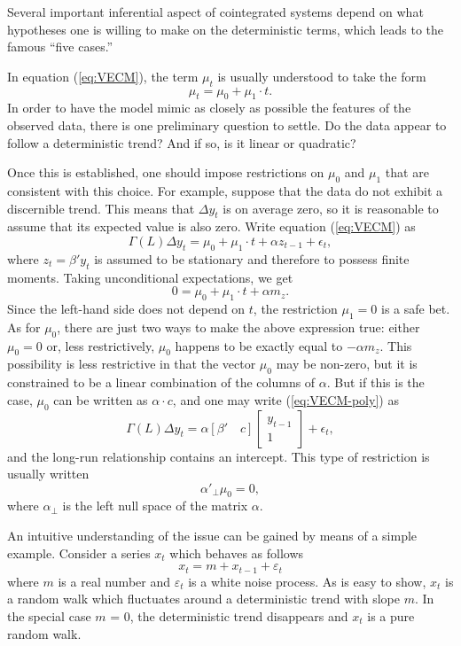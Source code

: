 Several important inferential aspect of cointegrated systems depend on
what hypotheses one is willing to make on the deterministic terms,
which leads to the famous ``five cases.''

In equation (\ref{eq:VECM}), the term $\mu_t$ is usually understood to
take the form
\[
  \mu_t = \mu_0 + \mu_1 \cdot t .
\]
In order to have the model mimic as closely as possible the features
of the observed data, there is one preliminary question to settle. Do
the data appear to follow a deterministic trend? And if so, is it
linear or quadratic?

Once this is established, one should impose restrictions on $\mu_0$
and $\mu_1$ that are consistent with this choice. For example, suppose
that the data do not exhibit a discernible trend. This means
that $\Delta y_t$ is on average zero, so it is reasonable to assume
that its expected value is also zero. Write equation (\ref{eq:VECM})
as
\begin{equation}
  \label{eq:VECM-poly}
  \Gamma(L) \Delta y_t = \mu_0 + \mu_1 \cdot t + \alpha z_{t-1} +
  \epsilon_t ,
\end{equation}
where $z_{t} = \beta' y_{t}$ is assumed to be stationary and therefore
to possess finite moments. Taking unconditional expectations, we get
\[ 
  0 = \mu_0 + \mu_1 \cdot t + \alpha m_z .
\]
Since the left-hand side does not depend on $t$, the restriction
$\mu_1 = 0$ is a safe bet. As for $\mu_0$, there are just two ways to
make the above expression true: either $\mu_0 = 0$ or, less
restrictively, $\mu_0$ happens to be exactly equal to $-\alpha m_z$.
This possibility is less restrictive in that the vector $\mu_0$ may be
non-zero, but it is constrained to be a linear combination of the
columns of $\alpha$. But if this is the case, $\mu_0$ can be written
as $\alpha \cdot c$, and one may write (\ref{eq:VECM-poly}) as
\[
  \Gamma(L) \Delta y_t = \alpha \left[ \beta' \quad c \right] 
  \left[ \begin{array}{c} y_{t-1} \\ 1 \end{array} \right]  
  + \epsilon_t ,
\]
and the long-run relationship contains an intercept. This type of
restriction is usually written
\[
  \alpha'_{\perp} \mu_0 = 0 ,
\]
where $\alpha_{\perp}$ is the left null space of the matrix $\alpha$.

An intuitive understanding of the issue can be gained by means of a
simple example. Consider a series $x_t$ which behaves as follows
%      
\[ x_t = m + x_{t-1} + \varepsilon_t \] 
%
where $m$ is a real number and $\varepsilon_t$ is a white noise
process. As is easy to show, $x_t$ is a random walk which fluctuates
around a deterministic trend with slope $m$. In the special case $m$ =
0, the deterministic trend disappears and $x_t$ is a pure random walk.
    

